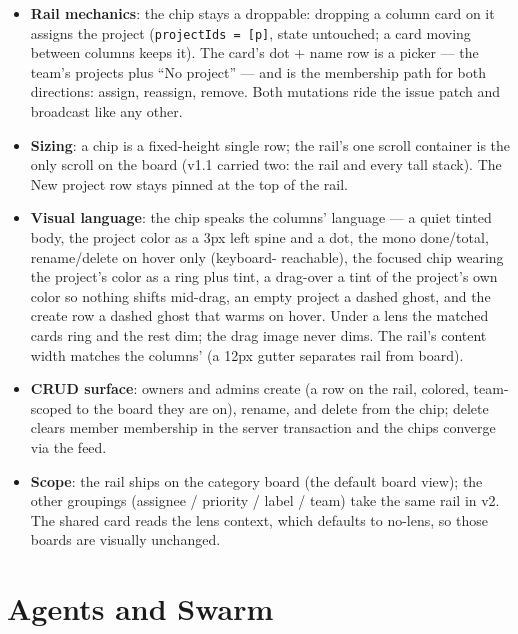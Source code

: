 \documentclass[11pt,a4paper]{report}
\begin{document}
\begin{itemize}
  opacity, every other card dims, and the unfocused chips dim with
  them. The focus is ephemeral client state --- it mutates nothing,
  syncs nothing, persists nothing --- and releases on the chip's
  re-click, on \texttt{Esc}, or on a click of the rail's background.
  If the focused project is deleted under a lens, the lens resolves to
  no-lens and the board returns to normal on its own.
\item \textbf{Rail mechanics}: the chip stays a droppable: dropping a
  column card on it assigns the project (\texttt{projectIds = [p]},
  state untouched; a card moving between columns keeps it). The card's
  dot + name row is a picker --- the team's projects plus ``No
  project'' --- and is the membership path for both directions:
  assign, reassign, remove. Both mutations ride the issue patch and
  broadcast like any other.
\item \textbf{Sizing}: a chip is a fixed-height single row; the rail's
  one scroll container is the only scroll on the board (v1.1 carried
  two: the rail and every tall stack). The New project row stays
  pinned at the top of the rail.
\item \textbf{Visual language}: the chip speaks the columns' language ---
  a quiet tinted body, the project color as a 3px left spine and a
  dot, the mono done/total, rename/delete on hover only (keyboard-
  reachable), the focused chip wearing the project's color as a ring
  plus tint, a drag-over a tint of the project's own color so nothing
  shifts mid-drag, an empty project a dashed ghost, and the create row
  a dashed ghost that warms on hover. Under a lens the matched cards
  ring and the rest dim; the drag image never dims. The rail's content
  width matches the columns' (a 12px gutter separates rail from board).
\item \textbf{CRUD surface}: owners and admins create (a row on the
  rail, colored, team-scoped to the board they are on), rename, and
  delete from the chip; delete clears member membership in the server
  transaction and the chips converge via the feed.
\item \textbf{Scope}: the rail ships on the category board (the default
  board view); the other groupings (assignee / priority / label / team)
  take the same rail in v2. The shared card reads the lens context,
  which defaults to no-lens, so those boards are visually unchanged.
\end{itemize}

\chapter{Agents and Swarm}
\label{ch:swarm}
\end{document}
